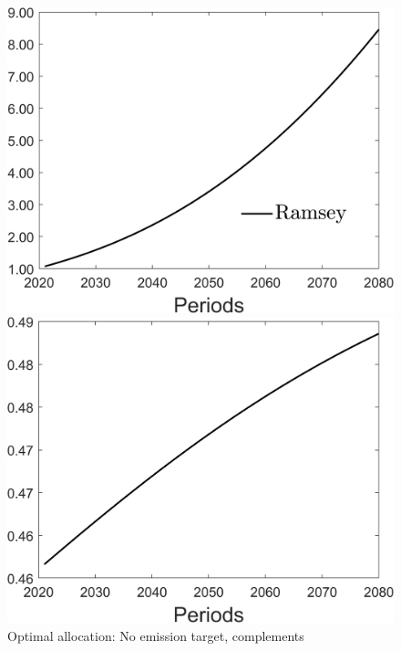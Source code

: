 \begin{figure}[h!!]
	\centering
	\caption{Optimal allocation: No emission target, complements }\label{fig:optallo_comp_onlyR}
	\begin{minipage}[]{0.32\textwidth}
		\includegraphics[width=1\textwidth]{../../codding_model/Own/figures/Rep_agent/staticonlyRam_separate_c_periods59_eppsilon0.40_zeta1.40_Ad08_Ac04_thetac0.70_thetad0.56_HetGrowth1_tauul0.181_util0_withtarget0_lgd1.png}
	\end{minipage}
	\begin{minipage}[]{0.32\textwidth}
		\includegraphics[width=1\textwidth]{../../codding_model/Own/figures/Rep_agent/staticonlyRam_separate_hh_periods59_eppsilon0.40_zeta1.40_Ad08_Ac04_thetac0.70_thetad0.56_HetGrowth1_tauul0.181_util0_withtarget0_lgd0.png}

\end{minipage}
\end{figure}
